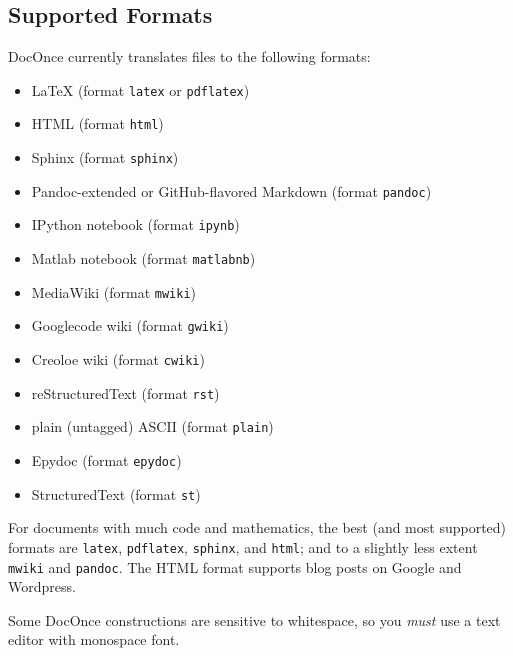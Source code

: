 \documentclass[%
oneside,                 %
final,                   %
10pt]{article}
\newenvironment{warning_mdfboxadmon}[1][]{
\begin{warning_mdfboxmdframed}[frametitle=#1]
}
{
\end{warning_mdfboxmdframed}
}
\begin{document}
\subsection{Supported Formats}
DocOnce currently translates files to the following formats:
\begin{itemize}
 \item {\LaTeX} (format \texttt{latex} or \texttt{pdflatex})
 \item HTML (format \texttt{html})
 \item Sphinx (format \texttt{sphinx})
 \item Pandoc-extended or GitHub-flavored Markdown (format \texttt{pandoc})
 \item IPython notebook (format \texttt{ipynb})
 \item Matlab notebook (format \texttt{matlabnb})
 \item MediaWiki (format \texttt{mwiki})
 \item Googlecode wiki (format \texttt{gwiki})
 \item Creoloe wiki (format \texttt{cwiki})
 \item reStructuredText (format \texttt{rst})
 \item plain (untagged) ASCII (format \texttt{plain})
 \item Epydoc (format \texttt{epydoc})
 \item StructuredText (format \texttt{st})
\end{itemize}
\noindent
For documents with much code and mathematics, the best (and most supported)
formats are \texttt{latex}, \texttt{pdflatex}, \texttt{sphinx}, and \texttt{html}; and to a slightly
less extent \texttt{mwiki} and \texttt{pandoc}. The HTML format supports blog posts on
Google and Wordpress.

\begin{warning_mdfboxadmon}
Some DocOnce constructions are sensitive to whitespace,
so you \emph{must} use a text editor with monospace font.
\end{warning_mdfboxadmon} %
\end{document}
